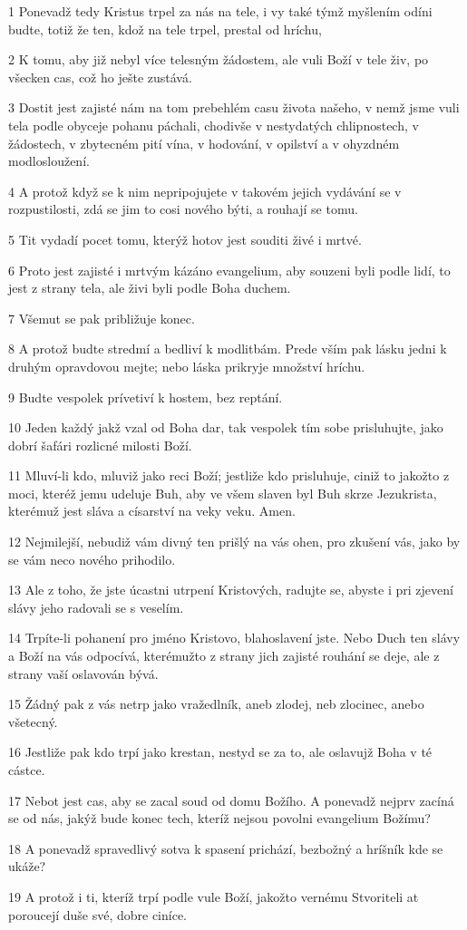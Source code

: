 \par 1 Ponevadž tedy Kristus trpel za nás na tele, i vy také týmž myšlením odíni budte, totiž že ten, kdož na tele trpel, prestal od hríchu,
\par 2 K tomu, aby již nebyl více telesným žádostem, ale vuli Boží v tele živ, po všecken cas, což ho ješte zustává.
\par 3 Dostit jest zajisté nám na tom prebehlém casu života našeho, v nemž jsme vuli tela podle obyceje pohanu páchali, chodivše v nestydatých chlipnostech, v žádostech, v zbytecném pití vína, v hodování, v opilství a v ohyzdném modlosloužení.
\par 4 A protož když se k nim nepripojujete v takovém jejich vydávání se v rozpustilosti, zdá se jim to cosi nového býti, a rouhají se tomu.
\par 5 Tit vydadí pocet tomu, kterýž hotov jest souditi živé i mrtvé.
\par 6 Proto jest zajisté i mrtvým kázáno evangelium, aby souzeni byli podle lidí, to jest z strany tela, ale živi byli podle Boha duchem.
\par 7 Všemut se pak približuje konec.
\par 8 A protož budte stredmí a bedliví k modlitbám. Prede vším pak lásku jedni k druhým opravdovou mejte; nebo láska prikryje množství hríchu.
\par 9 Budte vespolek prívetiví k hostem, bez reptání.
\par 10 Jeden každý jakž vzal od Boha dar, tak vespolek tím sobe prisluhujte, jako dobrí šafári rozlicné milosti Boží.
\par 11 Mluví-li kdo, mluviž jako reci Boží; jestliže kdo prisluhuje, ciniž to jakožto z moci, kteréž jemu udeluje Buh, aby ve všem slaven byl Buh skrze Jezukrista, kterémuž jest sláva a císarství na veky veku. Amen.
\par 12 Nejmilejší, nebudiž vám divný ten prišlý na vás ohen, pro zkušení vás, jako by se vám neco nového prihodilo.
\par 13 Ale z toho, že jste úcastni utrpení Kristových, radujte se, abyste i pri zjevení slávy jeho radovali se s veselím.
\par 14 Trpíte-li pohanení pro jméno Kristovo, blahoslavení jste. Nebo Duch ten slávy a Boží na vás odpocívá, kterémužto z strany jich zajisté rouhání se deje, ale z strany vaší oslavován bývá.
\par 15 Žádný pak z vás netrp jako vražedlník, aneb zlodej, neb zlocinec, anebo všetecný.
\par 16 Jestliže pak kdo trpí jako krestan, nestyd se za to, ale oslavujž Boha v té cástce.
\par 17 Nebot jest cas, aby se zacal soud od domu Božího. A ponevadž nejprv zacíná se od nás, jakýž bude konec tech, kteríž nejsou povolni evangelium Božímu?
\par 18 A ponevadž spravedlivý sotva k spasení prichází, bezbožný a hríšník kde se ukáže?
\par 19 A protož i ti, kteríž trpí podle vule Boží, jakožto vernému Stvoriteli at poroucejí duše své, dobre ciníce.

